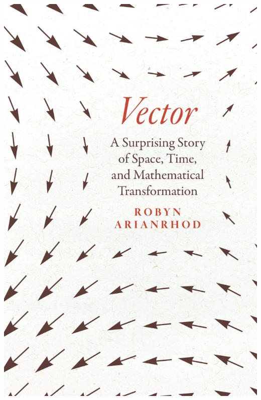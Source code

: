 \begin{subappendices}
\begin{marginfigure}
    \includegraphics[width=.8\textwidth]{figures/VectorArianrhod.jpg}
    \caption{\cite{arianrhod2024vector}}
    \label{fig:arianrhod}
\end{marginfigure}



\end{subappendices}
